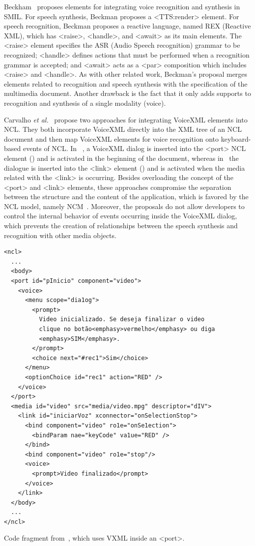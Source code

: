 Beckham~\cite{beckham_towards_2001} proposes elements for integrating voice
recognition and synthesis in SMIL. For speech synthesis, Beckman proposes a
<TTS:render> element. For speech recognition, Beckman proposes a reactive
language, named REX (Reactive XML), which has <raise>, <handle>, and <await> as
its main elements. The <raise> element specifies the ASR (Audio Speech
recognition) grammar to be recognized; <handle> defines actions that must be
performed when a recognition grammar is accepted; and <await> acts as a <par>
composition which includes <raise> and <handle>. As with other related work,
Beckman’s proposal merges elements related to recognition and speech synthesis
with the specification of the multimedia document. Another drawback is the fact
that it only adds supports to recognition and synthesis of a single modality
(voice).

Carvalho \textit{et al.}~\cite{carvalho_architectures_2008,carvalho_estendendo_2010}
propose two approaches for integrating VoiceXML elements into NCL. They both
incorporate VoiceXML directly into the XML tree of an NCL document and then map
VoiceXML elements for voice recognition onto keyboard-based events of NCL. In
~\cite{carvalho_architectures_2008}, a VoiceXML dialog is inserted into the
<port> NCL element () and is activated in the beginning of
the document, whereas in~\cite{carvalho_estendendo_2010} the dialogue is
inserted into the <link> element () and is activated when
the media related with the <link> is occurring. Besides overloading the concept
of the <port> and <link> elements, these approaches compromise the separation
between the structure and the content of the application, which is favored by
the NCL model, namely NCM~\cite{soares_nested_2009}. Moreover, the proposals do
not allow developers to control the internal behavior of events occurring inside
the VoiceXML dialog, which prevents the creation of relationships between the
speech synthesis and recognition with other media objects.

\begin{listing}[!ht]
\begin{verbatim}
<ncl>
  ...
  <body>
  <port id="pInicio" component="video">
    <voice>
      <menu scope="dia1og">
        <prompt>
          Video inicializado. Se deseja finalizar o video
          clique no botão<emphasy>vermelho</emphasy> ou diga
          <emphasy>SIM</emphasy>.
        </prompt>
        <choice next="#rec1">Sim</choice>
      </menu>
      <optionChoice id="rec1" action="RED" />
    </voice>
  </port>
  <media id="video" src="media/video.mpg" descriptor="dIV">
    <link id="iniciarVoz" xconnector="onSelectionStop">
      <bind component="video" ro1e="onSe1ection">
        <bindParam nae="keyCode" va1ue="RED" />
      </bind>
      <bind component="video" ro1e="stop"/>
      <voice>
        <prompt>Video finalizado</prompt>
      </voice>
    </link>
  </body>
  ...
</ncl>
\end{verbatim}
\caption[NCL using VXML inside an <port>.]{Code fragment
from~\cite{carvalho_architectures_2008}, which uses VXML inside an <port>.}
\label{list:carvalho1}
\end{listing}


